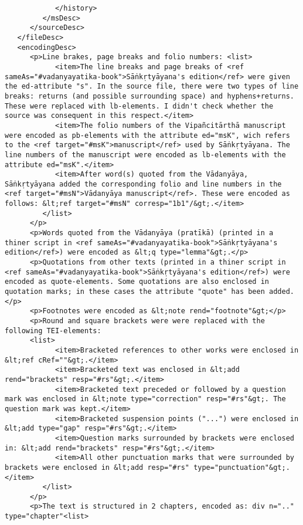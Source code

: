\documentclass[article,12pt,a4paper]{memoir}%
\begin{document}
\begin{verbatim}
            </history>
         </msDesc>
      </sourceDesc>
   </fileDesc>
   <encodingDesc>
      <p>Line brakes, page breaks and folio numbers: <list>
            <item>The line breaks and page breaks of <ref sameAs="#vadanyayatika-book">Sāṅkṛtyāyana's edition</ref> were given the ed-attribute "s". In the source file, there were two types of line breaks: returns (and possible surrounding space) and hyphens+returns. These were replaced with lb-elements. I didn't check whether the source was consequent in this respect.</item>
            <item>The folio numbers of the Vipañcitārthā manuscript were encoded as pb-elements with the attribute ed="msK", wich refers to the <ref target="#msK">manuscript</ref> used by Sāṅkṛtyāyana. The line numbers of the manuscript were encoded as lb-elements with the attribute ed="msK".</item>
            <item>After word(s) quoted from the Vādanyāya, Sāṅkṛtyāyana added the corresponding folio and line numbers in the <ref target="#msN">Vādanyāya manuscript</ref>. These were encoded as follows: &lt;ref target="#msN" corresp="1b1"/&gt;.</item>
         </list>
      </p>
      <p>Words quoted from the Vādanyāya (pratīkā) (printed in a thiner script in <ref sameAs="#vadanyayatika-book">Sāṅkṛtyāyana's edition</ref>) were encoded as &lt;q type="lemma"&gt;.</p>
      <p>Quotations from other texts (printed in a thiner script in <ref sameAs="#vadanyayatika-book">Sāṅkṛtyāyana's edition</ref>) were encoded as quote-elements. Some quotations are also enclosed in quotation marks; in these cases the attribute "quote" has been added.</p>
      <p>Footnotes were encoded as &lt;note rend="footnote"&gt;</p>
      <p>Round and square brackets were were replaced with the following TEI-elements:
      <list>
            <item>Bracketed references to other works were enclosed in &lt;ref cRef=""&gt;.</item>
            <item>Bracketed text was enclosed in &lt;add rend="brackets" resp="#rs"&gt;.</item>
            <item>Bracketed text preceded or followed by a question mark was enclosed in &lt;note type="correction" resp="#rs"&gt;. The question mark was kept.</item>
            <item>Bracketed suspension points ("...") were enclosed in &lt;add type="gap" resp="#rs"&gt;.</item>
            <item>Question marks surrounded by brackets were enclosed in: &lt;add rend="brackets" resp="#rs"&gt;.</item>
            <item>All other punctuation marks that were surrounded by brackets were enclosed in &lt;add resp="#rs" type="punctuation"&gt;.</item>
         </list>
      </p>
      <p>The text is structured in 2 chapters, encoded as: div n=".." type="chapter"<list>

\end{verbatim}
\end{document}
